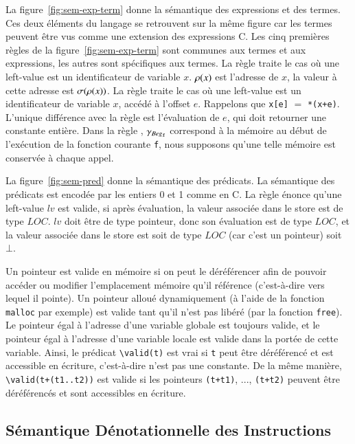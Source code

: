 La figure~\ref{fig:sem-exp-term} donne la sémantique des expressions et des
termes.
Ces deux éléments du langage se retrouvent sur la même figure car les termes
peuvent être vus comme une extension des expressions C.
Les cinq premières règles de la figure~\ref{fig:sem-exp-term} sont communes aux
termes et aux expressions, les autres sont spécifiques aux termes.
La règle  traite le cas où une left-value est un identificateur
de variable $x$.
$\rho(x)$ est l'adresse de $x$, la valeur à cette adresse est $\sigma(\rho(x))$.
La règle  traite le cas où une left-value est un identificateur
de variable $x$, accédé à l'offset $e$.
Rappelons que \lstinline'x[e]' $=$ \lstinline'*(x+e)'.
L'unique différence avec la règle  est l'évaluation de $e$, qui
doit retourner une constante entière.
Dans la règle , $\gamma_{Beg_{\mathtt{f}}}$ correspond à la mémoire au
début de l'exécution de la fonction courante \lstinline'f', nous supposons
qu'une telle mémoire est conservée à chaque appel.

La figure~\ref{fig:sem-pred} donne la sémantique des prédicats.
La sémantique des prédicats est encodée par les entiers 0 et 1 comme en C.
La règle  énonce qu'une left-value $\mathit{lv}$ est valide,
si après évaluation, la valeur associée dans le store est de type $LOC$.
$\mathit{lv}$ doit être de type pointeur, donc son évaluation est de type
$LOC$, et la valeur associée dans le store est soit de type $LOC$ (car c'est
un pointeur) soit $\bot$.

Un pointeur est valide en mémoire si on peut le déréférencer afin de pouvoir
accéder ou modifier l'emplacement mémoire qu'il référence (c'est-à-dire vers
lequel il pointe).
Un pointeur alloué dynamiquement (à l'aide de la fonction \lstinline'malloc' par
exemple) est valide tant qu'il n'est pas libéré (par la fonction
\lstinline'free').
Le pointeur égal à l'adresse d'une variable globale est toujours valide, et le
pointeur égal à l'adresse d'une variable locale est valide dans la portée de
cette variable.
Ainsi, le prédicat \lstinline'\valid(t)' est vrai si \lstinline't'
peut être déréférencé et est accessible en écriture, c'est-à-dire n'est pas une
constante.
De la même manière, \lstinline'\valid(t+(t1..t2))' est valide si les pointeurs
\lstinline'(t+t1)', ..., \lstinline'(t+t2)' peuvent être déréférencés et sont
accessibles en écriture.




\subsection{Sémantique Dénotationnelle des Instructions}

